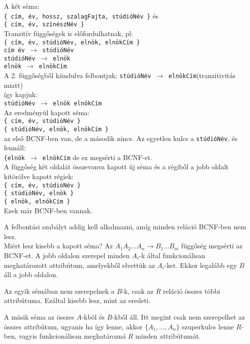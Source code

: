 \documentclass[fleqn,10pt,a4paper]{article}
\theoremstyle{magyar}
\begin{document}
  A két séma:\\
  \texttt{\{ cím, év, hossz, szalagFajta, stúdióNév \}} és\\
  \texttt{\{ cím, év, színészNév \}}\\

  Tranzitív függőségek is előfordulhatnak, pl:\\
  \texttt{\{ cím, év, stúdióNév, elnök, elnökCím \}}\\
  \texttt{cím év $\to$ stúdióNév}\\
  \texttt{stúdióNév $\to$ elnök}\\
  \texttt{elnök $\to$ elnökCím}\\
  A 2. függőségből kiindulva felbontjuk:
  \texttt{stúdióNév $\to$ elnökCím}\quad (tranzitivitás miatt)\\
  így kapjuk:\\
  \texttt{stúdióNév $\to$ elnök elnökCím}\\

  Az eredményül kapott séma:\\
  \texttt{\{ cím, év, stúdióNév \}}\\
  \texttt{\{ stúdióNév, elnök, elnökCím \}}\\
  az első BCNF-ben van, de a második nincs. Az egyetlen kulcs a \texttt{stúdióNév}, és fennáll:\\
  \texttt{\{elnök $\to$ elnökCím} \quad de ez megsérti a BCNF-et.\\
  A függőség két oldalát összevonva kapott új séma és a régiből a jobb oldalt kitörölve kapott régiek:\\
  \texttt{\{ cím, év, stúdióNév \}}\\
  \texttt{\{ stúdióNév, elnök \}}\\
  \texttt{\{ elnök, elnökCím \}}\\
  Ezek már BCNF-ben vannak.

  A felbontási szabályt addig kell alkalmazni, amíg minden reláció BCNF-ben nem lesz.\\

  Miért lesz kisebb a kapott séma? Az $A_1A_2\ldots A_n\to B_1\ldots B_m$ függőség megsérti az BCNF-et. A jobb oldalon
  szerepel minden $A_i$-k által funkcionálisan meghatározott attribútum, amelyekből elvettük az $A_i$-ket. Ekkor
  legalább egy $B$ áll a jobb oldalon.

  Az egyik sémában nem szerepelnek a $B$-k, csak az $R$ reláció összes többi attribútuma. Ezáltal kisebb lesz, mint az
  eredeti.
  
  A másik séma az összes $A$-kból és $B$-kből áll. Itt megint csak nem szerepelhet az összes attribútum, ugyanis ha így
  lenne, akkor $\{A_1,\ldots,A_n\}$ szuperkulcs lenne $R$-ben, vagyis funkcionálisan meghatározná $R$ minden
  attribútumát.
\end{document}
